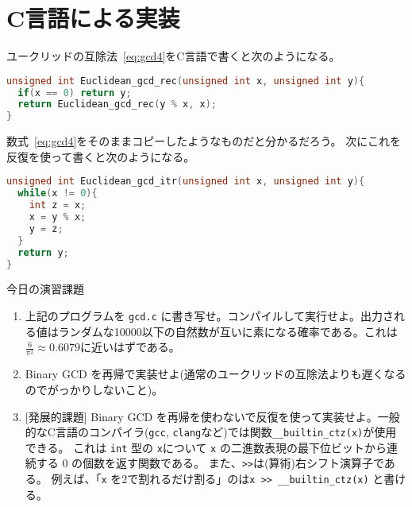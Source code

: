 \documentclass[a4paper,twoside,onecolumn,openany,article,10pt]{memoir}
\theoremstyle{remark}
\begin{document}


\section{C言語による実装}
ユークリッドの互除法~\eqref{eq:gcd4}をC言語で書くと次のようになる。
\begin{lstlisting}[basicstyle=\ttfamily\normalsize,showstringspaces=false,language=C,frame=single]
unsigned int Euclidean_gcd_rec(unsigned int x, unsigned int y){
  if(x == 0) return y;
  return Euclidean_gcd_rec(y % x, x);
}
\end{lstlisting}
数式~\eqref{eq:gcd4}をそのままコピーしたようなものだと分かるだろう。
次にこれを反復を使って書くと次のようになる。
\begin{lstlisting}[basicstyle=\ttfamily\normalsize,showstringspaces=false,language=C,frame=single]
unsigned int Euclidean_gcd_itr(unsigned int x, unsigned int y){
  while(x != 0){
    int z = x;
    x = y % x;
    y = z;
  }
  return y;
}
\end{lstlisting}

\vspace{3em}
\noindent
今日の演習課題
\begin{enumerate}
\item 上記のプログラムを \texttt{gcd.c} に書き写せ。コンパイルして実行せよ。出力される値はランダムな10000以下の自然数が互いに素になる確率である。これは$\frac6{\pi^2}\approx 0.6079$に近いはずである。
\item Binary GCD を再帰で実装せよ(通常のユークリッドの互除法よりも遅くなるのでがっかりしないこと)。
\item {[発展的課題]} Binary GCD を再帰を使わないで反復を使って実装せよ。一般的なC言語のコンパイラ(\texttt{gcc}, \texttt{clang}など)では関数\texttt{\_\_builtin\_ctz(x)}が使用できる。
これは \texttt{int} 型の \texttt{x}について \texttt{x} の二進数表現の最下位ビットから連続する 0 の個数を返す関数である。
また、\texttt{>{}>}は(算術)右シフト演算子である。
例えば、「\texttt{x} を2で割れるだけ割る」のは\texttt{x >{}> \_\_builtin\_ctz(x)} と書ける。
\end{enumerate}
\fi
\end{document}
